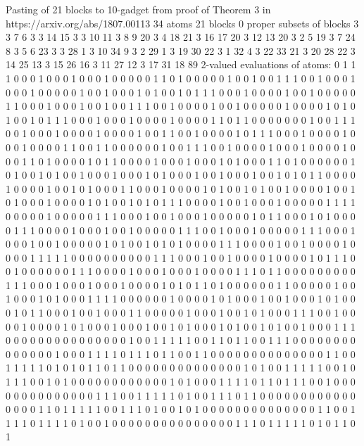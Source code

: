 Pasting of 21 blocks to 10-gadget from proof of Theorem 3 in https://arxiv.org/abs/1807.00113
34 atoms
21 blocks
 0 proper subsets of blocks
 3 3 7 6
 3 3 14 15
 3 3 10 11
 3 8 9 20
 3 4 18 21
 3 16 17 20
 3 12 13 20
 3 2 5 19
 3 7 24 8
 3 5 6 23
 3 3 28 1
 3 10 34 9
 3 2 29 1
 3 19 30 22
 3 1 32 4
 3 22 33 21
 3 20 28 22
 3 14 25 13
 3 15 26 16
 3 11 27 12
 3 17 31 18
89 2-valued evaluations of atoms:
0 1 1 1 0 0 0 1 0 0 0 1 0 0 0 1 0 0 0 0 0 1 1 0 1 0 0 0 0 0 1 0 0 1
0 0 1 1 1 0 0 1 0 0 0 1 0 0 0 1 0 0 0 0 0 1 0 0 1 0 0 0 1 0 1 0 0 1
0 1 1 1 0 0 0 1 0 0 0 0 1 0 0 1 0 0 0 0 0 1 1 0 0 0 1 0 0 0 1 0 0 1
0 0 1 1 1 0 0 1 0 0 0 0 1 0 0 1 0 0 0 0 0 1 0 0 0 0 1 0 1 0 1 0 0 1
0 1 1 1 0 0 0 1 0 0 0 1 0 0 0 0 1 0 0 0 0 1 1 0 1 1 0 0 0 0 0 0 0 1
0 0 1 1 1 0 0 1 0 0 0 1 0 0 0 0 1 0 0 0 0 1 0 0 1 1 0 0 1 0 0 0 0 1
0 1 1 1 0 0 0 1 0 0 0 0 1 0 0 0 1 0 0 0 0 1 1 0 0 1 1 0 0 0 0 0 0 1
0 0 1 1 1 0 0 1 0 0 0 0 1 0 0 0 1 0 0 0 0 1 0 0 0 1 1 0 1 0 0 0 0 1
0 1 1 0 0 0 0 1 0 0 0 1 0 0 0 1 0 1 0 0 0 1 1 0 1 0 0 0 0 0 0 1 0 1
0 0 1 0 1 0 0 1 0 0 0 1 0 0 0 1 0 1 0 0 0 1 0 0 1 0 0 0 1 0 0 1 0 1
0 1 1 0 0 0 0 1 0 0 0 0 1 0 0 1 0 1 0 0 0 1 1 0 0 0 1 0 0 0 0 1 0 1
0 0 1 0 1 0 0 1 0 0 0 0 1 0 0 1 0 1 0 0 0 1 0 0 0 0 1 0 1 0 0 1 0 1
0 1 1 1 0 0 0 0 1 0 0 1 0 0 0 1 0 0 0 0 0 1 1 1 1 0 0 0 0 0 1 0 0 0
0 0 1 1 1 0 0 0 1 0 0 1 0 0 0 1 0 0 0 0 0 1 0 1 1 0 0 0 1 0 1 0 0 0
0 1 1 1 0 0 0 0 1 0 0 0 1 0 0 1 0 0 0 0 0 1 1 1 0 0 1 0 0 0 1 0 0 0
0 0 1 1 1 0 0 0 1 0 0 0 1 0 0 1 0 0 0 0 0 1 0 1 0 0 1 0 1 0 1 0 0 0
0 1 1 1 0 0 0 0 1 0 0 1 0 0 0 0 1 0 0 0 0 1 1 1 1 1 0 0 0 0 0 0 0 0
0 0 1 1 1 0 0 0 1 0 0 1 0 0 0 0 1 0 0 0 0 1 0 1 1 1 0 0 1 0 0 0 0 0
0 1 1 1 0 0 0 0 1 0 0 0 1 0 0 0 1 0 0 0 0 1 1 1 0 1 1 0 0 0 0 0 0 0
0 0 1 1 1 0 0 0 1 0 0 0 1 0 0 0 1 0 0 0 0 1 0 1 0 1 1 0 1 0 0 0 0 0
0 1 1 0 0 0 0 0 1 0 0 1 0 0 0 1 0 1 0 0 0 1 1 1 1 0 0 0 0 0 0 1 0 0
0 0 1 0 1 0 0 0 1 0 0 1 0 0 0 1 0 1 0 0 0 1 0 1 1 0 0 0 1 0 0 1 0 0
0 1 1 0 0 0 0 0 1 0 0 0 1 0 0 1 0 1 0 0 0 1 1 1 0 0 1 0 0 0 0 1 0 0
0 0 1 0 1 0 0 0 1 0 0 0 1 0 0 1 0 1 0 0 0 1 0 1 0 0 1 0 1 0 0 1 0 0
0 1 1 1 0 0 0 0 0 0 0 0 0 0 0 0 0 0 0 1 0 0 1 1 1 1 1 0 0 1 1 0 1 1
0 0 1 1 1 0 0 0 0 0 0 0 0 0 0 0 0 0 0 1 0 0 0 1 1 1 1 0 1 1 1 0 1 1
0 0 1 1 0 0 0 0 0 0 0 0 0 0 0 0 0 0 1 1 0 0 1 1 1 1 1 0 1 0 1 0 1 1
0 1 1 0 0 0 0 0 0 0 0 0 0 0 0 0 0 1 0 1 0 0 1 1 1 1 1 0 0 1 0 1 1 1
0 0 1 0 1 0 0 0 0 0 0 0 0 0 0 0 0 1 0 1 0 0 0 1 1 1 1 0 1 1 0 1 1 1
0 0 1 0 0 0 0 0 0 0 0 0 0 0 0 0 0 1 1 1 0 0 1 1 1 1 1 0 1 0 0 1 1 1
0 1 1 0 0 0 0 0 0 0 0 0 0 0 0 0 0 0 0 1 1 0 1 1 1 1 1 0 0 1 1 1 0 1
0 0 1 0 1 0 0 0 0 0 0 0 0 0 0 0 0 0 0 1 1 0 0 1 1 1 1 0 1 1 1 1 0 1
0 0 1 0 0 0 0 0 0 0 0 0 0 0 0 0 0 0 1 1 1 0 1 1 1 1 1 0 1 0 1 1 0 1
